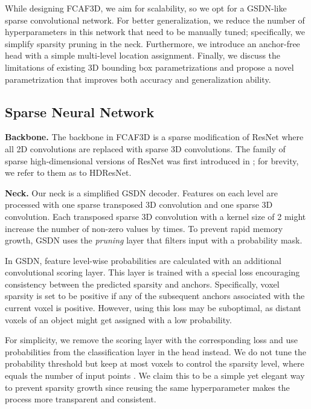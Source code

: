 \documentclass[runningheads]{llncs}
\begin{document}
While designing FCAF3D, we aim for scalability, so we opt for a GSDN-like sparse convolutional network. For better generalization, we reduce the number of hyperparameters in this network that need to be manually tuned; specifically, we simplify sparsity pruning in the neck. Furthermore, we introduce an anchor-free head with a simple multi-level location assignment. Finally, we discuss the limitations of existing 3D bounding box parametrizations and propose a novel parametrization that improves both accuracy and generalization ability.

\subsection{Sparse Neural Network}

\textbf{Backbone.} The backbone in FCAF3D is a sparse modification of ResNet \cite{he2016resnet} where all 2D convolutions are replaced with sparse 3D convolutions. The family of sparse high-dimensional versions of ResNet was first introduced in \cite{choy2019minkowski}; for brevity, we refer to them as to HDResNet. 

\textbf{Neck.} Our neck is a simplified GSDN decoder. Features on each level are processed with one sparse transposed 3D convolution and one sparse 3D convolution. Each transposed sparse 3D convolution with a kernel size of 2 might increase the number of non-zero values by  times. To prevent rapid memory growth, GSDN uses the \textit{pruning} layer that filters input with a probability mask.

In GSDN, feature level-wise probabilities are calculated with an additional convolutional scoring layer. This layer is trained with a special loss encouraging consistency between the predicted sparsity and anchors. Specifically, voxel sparsity is set to be positive if any of the subsequent anchors associated with the current voxel is positive. However, using this loss may be suboptimal, as distant voxels of an object might get assigned with a low probability. 

For simplicity, we remove the scoring layer with the corresponding loss and use probabilities from the classification layer in the head instead. We do not tune the probability threshold but keep at most  voxels to control the sparsity level, where  equals the number of input points . We claim this to be a simple yet elegant way to prevent sparsity growth since reusing the same hyperparameter makes the process more transparent and consistent.
\end{document}
